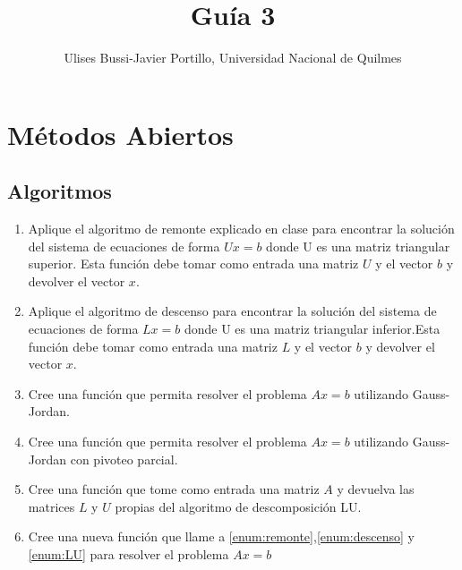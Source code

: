 \documentclass[a4paper,11pt]{article}
\makeatletter
\theoremstyle{mytheor}
\renewcommand{\maketitle}{
\colorbox{gray!20}{\framebox[\linewidth]{ \huge \textsc{\@title} } 
\lfoot{\@title}
}

}
\makeatother
\begin{document}
\title{Guía 3}

\author{Ulises Bussi-Javier Portillo, Universidad Nacional de Quilmes}


\maketitle \vspace{20pt}

\section*{Métodos Abiertos}
%

\subsection*{Algoritmos}

\begin{enumerate}[label=\Roman*]

\item \label{enum:remonte} Aplique el algoritmo de remonte explicado en clase para encontrar la solución del sistema de ecuaciones de forma $U x =b$ donde U es una matriz triangular superior. Esta función debe tomar como entrada una matriz $U$ y el vector $b$ y devolver el vector $x$.

\item \label{enum:descenso} Aplique el algoritmo de descenso para encontrar la solución del sistema de ecuaciones de forma $L x =b$ donde U es una matriz triangular inferior.Esta función debe tomar como entrada una matriz $L$ y el vector $b$ y devolver el vector $x$.



\item \label{enum:gaussJordan} Cree una función que permita resolver el problema $A x=b$ utilizando Gauss-Jordan.

\item \label{enum:pivot} Cree una función que permita resolver el problema $A x=b$ utilizando Gauss-Jordan con pivoteo parcial.


\item \label{enum:LU} Cree una función que tome como entrada una matriz $A$ y devuelva las matrices $L$ y $U$ propias del algoritmo de descomposición LU.


\item \label{enum:errStop} Cree una nueva función que llame a \ref{enum:remonte},\ref{enum:descenso} y \ref{enum:LU} para resolver el problema $A x=b$


\end{enumerate}
\end{document}
